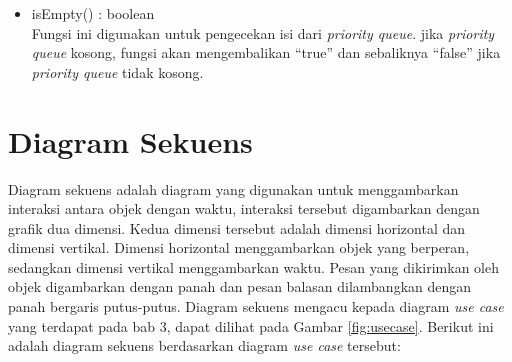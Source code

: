 \begin{itemize}
\begin{itemize}
\begin{itemize}
      \item isEmpty() : boolean\\
      Fungsi ini digunakan untuk pengecekan isi dari \textit{priority queue}.
      jika \textit{priority queue} kosong, fungsi akan mengembalikan ``true''
      dan sebaliknya ``false'' jika \textit{priority queue} tidak kosong.
    \end{itemize}
  \end{itemize}
\end{itemize}

\section{Diagram Sekuens}
Diagram sekuens adalah diagram yang digunakan untuk menggambarkan interaksi
antara objek dengan waktu, interaksi tersebut digambarkan dengan grafik dua
dimensi. Kedua dimensi tersebut adalah dimensi horizontal dan dimensi vertikal.
Dimensi horizontal menggambarkan objek yang berperan, sedangkan dimensi
vertikal menggambarkan waktu. Pesan yang dikirimkan oleh objek digambarkan
dengan panah dan pesan balasan dilambangkan dengan panah bergaris putus-putus.
Diagram sekuens mengacu kepada diagram \textit{use case} yang
terdapat pada bab 3, dapat dilihat pada Gambar \ref{fig:usecase}. Berikut ini
adalah diagram sekuens berdasarkan diagram \textit{use case} tersebut:
